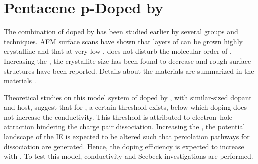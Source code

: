 \chapter{Pentacene p-Doped by \FV}\label{chap:P5}

%

\newpage
%
The combination of \pen doped by \FV has been studied earlier by several groups and techniques. AFM surface scans have shown that layers of \pen can be grown highly crystalline and that at very low \CLong, \FV does not disturb the molecular order of \pen\cite{Ha2009}. Increasing the \CLong, the crystallite size has been found to decrease and rough surface structures have been reported\cite{Kleemann2012a}.
Details about the materials are summarized in the materials .

Theoretical studies on this model system of \pen doped by \FV, with similar-sized dopant and host, suggest\cite{Mityashin2012a} that for \OSCs, a certain threshold \CLong exists, below which doping does not increase the conductivity. This threshold is attributed to electron--hole attraction hindering the charge pair dissociation. Increasing the \CLong \C, the potential landscape of the \IE IE is expected to be altered such that percolation pathways for dissociation are generated. Hence, the doping efficiency is expected to increase with \C.
%
To test this model, conductivity and Seebeck investigations are performed.

